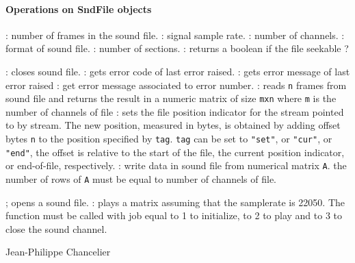 \paragraph{Operations on SndFile objects}
\begin{itemize}
  : number of frames in the sound file. 
  : signal sample rate.
  : number of channels. 
  :  format of sound file. 
  : number of sections.
  : returns a boolean if the file seekable ? 
\end{itemize}
\begin{itemize}
  : closes sound file. 
  : gets error code of last error raised. 
  : gets error message of last error raised
  : get error message associated to error number.
  :  reads \verb+n+ frames from sound file and returns the 
  result in a numeric matrix of size \verb+mxn+ where \verb+m+ is the 
  number of channels of file
  : sets the file position indicator for the stream pointed
       to by stream.  The new position, measured in bytes, is obtained  by  adding
       offset  bytes \verb+n+  to  the  position  specified by \verb+tag+. 
        \verb+tag+ can be set to \verb+"set"+, or \verb+"cur"+, or \verb+"end"+, 
	the offset is relative to the start of the
       file, the current position indicator, or end-of-file, respectively.
  : write data in sound file from numerical matrix \verb+A+. 
  the number of rows of \verb+A+ must be equal to number of channels of file.
\end{itemize}

\begin{itemize}
  ; opens a sound file. 
  : plays a matrix assuming that the samplerate is 22050.
    The function must be called with job equal to 1 to initialize, to 2 to play 
    and to 3 to close the sound channel.
\end{itemize}

\begin{examples}
  \begin{program}
  \end{program}
\end{examples}

\begin{manseealso}

\end{manseealso}

\begin{authors}
  Jean-Philippe Chancelier 
\end{authors}

